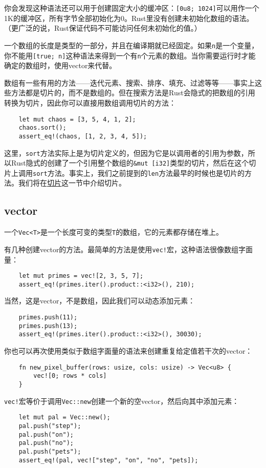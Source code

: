 你会发现这种语法还可以用于创建固定大小的缓冲区：\texttt{[0u8; 1024]}可以用作一个1K的缓冲区，所有字节全部初始化为0。Rust里没有创建未初始化数组的语法。（更广泛的说，Rust保证代码不可能访问任何未初始化的值。）

一个数组的长度是类型的一部分，并且在编译期就已经固定。如果\texttt{n}是一个变量，你不能用\texttt{[true; n]}这种语法来得到一个有\texttt{n}个元素的数组。当你需要运行时才能确定的数组时，使用vector来代替。

数组有一些有用的方法——迭代元素、搜索、排序、填充、过滤等等——事实上这些方法都是切片的，而不是数组的。但在搜索方法是Rust会隐式的把数组的引用转换为切片，因此你可以直接用数组调用切片的方法：
\begin{verbatim}
    let mut chaos = [3, 5, 4, 1, 2];
    chaos.sort();
    assert_eq!(chaos, [1, 2, 3, 4, 5]);
\end{verbatim}

这里，\texttt{sort}方法实际上是为切片定义的，但因为它是以调用者的引用为参数，所以Rust隐式的创建了一个引用整个数组的\texttt{\&mut [i32]}类型的切片，然后在这个切片上调用\texttt{sort}方法。事实上，我们之前提到的\texttt{len}方法最早的时候也是切片的方法。我们将在\hyperref[slice]{切片}这一节中介绍切片。

\subsection{vector}\label{vector}

一个\texttt{Vec<T>}是一个长度可变的类型\texttt{T}的数组，它的元素都存储在堆上。

有几种创建vector的方法。最简单的方法是使用\texttt{vec!}宏，这种语法很像数组字面量：
\begin{verbatim}
    let mut primes = vec![2, 3, 5, 7];
    assert_eq!(primes.iter().product::<i32>(), 210);
\end{verbatim}
当然，这是vector，不是数组，因此我们可以动态添加元素：
\begin{verbatim}
    primes.push(11);
    primes.push(13);
    assert_eq!(primes.iter().product::<i32>(), 30030);
\end{verbatim}

你也可以再次使用类似于数组字面量的语法来创建重复给定值若干次的vector：
\begin{verbatim}
    fn new_pixel_buffer(rows: usize, cols: usize) -> Vec<u8> {
        vec![0; rows * cols]
    }
\end{verbatim}
\texttt{vec!}宏等价于调用\texttt{Vec::new}创建一个新的空vector，然后向其中添加元素：
\begin{verbatim}
    let mut pal = Vec::new();
    pal.push("step");
    pal.push("on");
    pal.push("no");
    pal.push("pets");
    assert_eq!(pal, vec!["step", "on", "no", "pets]);
\end{verbatim}

